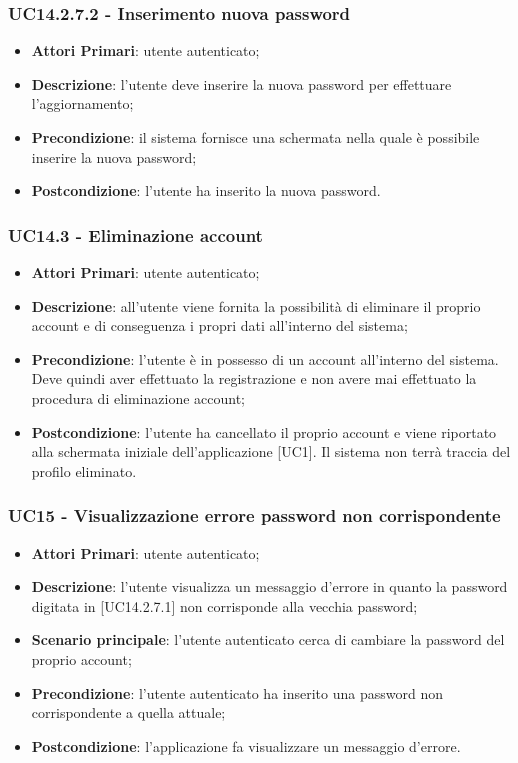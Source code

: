 \subsubsection{UC14.2.7.2 - Inserimento nuova password}
\begin{itemize}
	\item \textbf{Attori Primari}: utente autenticato;
	\item \textbf{Descrizione}: l'utente deve inserire la nuova password per effettuare l'aggiornamento;
	\item \textbf{Precondizione}: il sistema fornisce una schermata nella quale è possibile inserire la nuova password;
	\item \textbf{Postcondizione}: l'utente ha inserito la nuova password.
\end{itemize}
\subsubsection{UC14.3 - Eliminazione account}
\begin{itemize}
	\item \textbf{Attori Primari}: utente autenticato;
	\item \textbf{Descrizione}: all'utente viene fornita la possibilità di eliminare il proprio account e di conseguenza i propri dati all'interno del sistema;
	\item \textbf{Precondizione}: l'utente è in possesso di un account all'interno del sistema. Deve quindi aver effettuato la registrazione e non avere mai effettuato la procedura di eliminazione account;
	\item \textbf{Postcondizione}: l'utente ha cancellato il proprio account e viene riportato alla schermata iniziale dell'applicazione [UC1]. Il sistema non terrà traccia del profilo eliminato.
\end{itemize}
\subsubsection{UC15 - Visualizzazione errore password non corrispondente}
\begin{itemize}
	\item \textbf{Attori Primari}: utente autenticato;
	\item \textbf{Descrizione}: l'utente visualizza un messaggio d'errore in quanto la password digitata in [UC14.2.7.1] non corrisponde alla vecchia password;
	\item \textbf{Scenario principale}: l'utente autenticato cerca di cambiare la password del proprio account;
	\item \textbf{Precondizione}: l'utente autenticato ha inserito una password non corrispondente a quella attuale;
	\item \textbf{Postcondizione}: l'applicazione fa visualizzare un messaggio d'errore.
\end{itemize}



